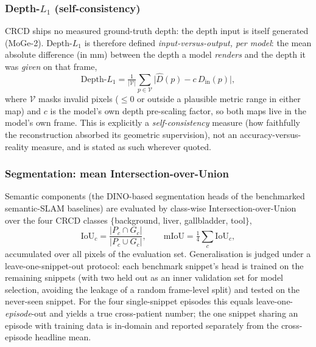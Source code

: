 \documentclass{article}
\begin{document}
\subsubsection{Depth-$L_1$ (self-consistency)}
\label{sec:eval_depth}

CRCD ships no measured ground-truth depth: the depth input is itself generated (MoGe-2). Depth-$L_1$ is therefore defined \emph{input-versus-output, per model}: the mean absolute difference (in mm) between the depth a model \emph{renders} and the depth it was \emph{given} on that frame,
\begin{equation}
\mathrm{Depth}\text{-}L_1 = \tfrac{1}{|\mathcal{V}|} \sum_{p \in \mathcal{V}} \bigl| \hat{D}(p) - c\,D_{\mathrm{in}}(p) \bigr| ,
\end{equation}
where $\mathcal{V}$ masks invalid pixels ($\leq 0$ or outside a plausible metric range in either map) and $c$ is the model's own depth pre-scaling factor, so both maps live in the model's own frame. This is explicitly a \emph{self-consistency} measure (how faithfully the reconstruction absorbed its geometric supervision), not an accuracy-versus-reality measure, and is stated as such wherever quoted.

\subsubsection{Segmentation: mean Intersection-over-Union}
\label{sec:eval_miou}

Semantic components (the DINO-based segmentation heads of the benchmarked semantic-SLAM baselines) are evaluated by class-wise Intersection-over-Union over the four CRCD classes $\{$background, liver, gallbladder, tool$\}$,
\begin{equation}
\mathrm{IoU}_c = \frac{|P_c \cap G_c|}{|P_c \cup G_c|}, \qquad \mathrm{mIoU} = \tfrac{1}{4} \textstyle\sum_c \mathrm{IoU}_c ,
\end{equation}
accumulated over all pixels of the evaluation set. Generalisation is judged under a leave-one-snippet-out protocol: each benchmark snippet's head is trained on the remaining snippets (with two held out as an inner validation set for model selection, avoiding the leakage of a random frame-level split) and tested on the never-seen snippet. For the four single-snippet episodes this equals leave-one-\emph{episode}-out and yields a true cross-patient number; the one snippet sharing an episode with training data is in-domain and reported separately from the cross-episode headline mean.
\end{document}
